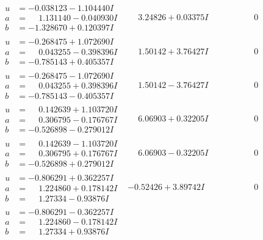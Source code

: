 \documentclass[1p]{elsarticle_modified}
\theoremstyle{definition}
\begin{document}
$$\begin{array}{c|c|c}
\begin{aligned}
u &= -0.038123 - 1.104440 I \\
a &= \phantom{-}1.131140 - 0.040930 I \\
b &= -1.328670 + 0.120397 I\end{aligned}
 & \phantom{-}3.24826 + 0.03375 I & \phantom{-0.000000 } 0 \\ \hline\begin{aligned}
u &= -0.268475 + 1.072690 I \\
a &= \phantom{-}0.043255 - 0.398396 I \\
b &= -0.785143 + 0.405357 I\end{aligned}
 & \phantom{-}1.50142 + 3.76427 I & \phantom{-0.000000 } 0 \\ \hline\begin{aligned}
u &= -0.268475 - 1.072690 I \\
a &= \phantom{-}0.043255 + 0.398396 I \\
b &= -0.785143 - 0.405357 I\end{aligned}
 & \phantom{-}1.50142 - 3.76427 I & \phantom{-0.000000 } 0 \\ \hline\begin{aligned}
u &= \phantom{-}0.142639 + 1.103720 I \\
a &= \phantom{-}0.306795 - 0.176767 I \\
b &= -0.526898 - 0.279012 I\end{aligned}
 & \phantom{-}6.06903 + 0.32205 I & \phantom{-0.000000 } 0 \\ \hline\begin{aligned}
u &= \phantom{-}0.142639 - 1.103720 I \\
a &= \phantom{-}0.306795 + 0.176767 I \\
b &= -0.526898 + 0.279012 I\end{aligned}
 & \phantom{-}6.06903 - 0.32205 I & \phantom{-0.000000 } 0 \\ \hline\begin{aligned}
u &= -0.806291 + 0.362257 I \\
a &= \phantom{-}1.224860 + 0.178142 I \\
b &= \phantom{-}1.27334 - 0.93876 I\end{aligned}
 & -0.52426 + 3.89742 I & \phantom{-0.000000 } 0 \\ \hline\begin{aligned}
u &= -0.806291 - 0.362257 I \\
a &= \phantom{-}1.224860 - 0.178142 I \\
b &= \phantom{-}1.27334 + 0.93876 I\end{aligned}

\end{array}$$
\end{document}

